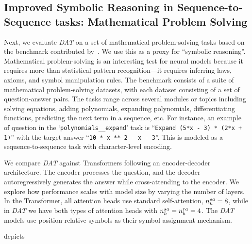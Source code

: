 
\subsection{Improved Symbolic Reasoning in Sequence-to-Sequence tasks: Mathematical Problem Solving}\label{ssec:math}

Next, we evaluate \textit{DAT} on a set of mathematical problem-solving tasks based on the benchmark contributed by~\citet{saxtonAnalyzingMathematicalReasoning2019}. We use this as a proxy for ``symbolic reasoning''. Mathematical problem-solving is an interesting test for neural models because it requires more than statistical pattern recognition---it requires inferring laws, axioms, and symbol manipulation rules. The benchmark consists of a suite of mathematical problem-solving datasets, with each dataset consisting of a set of question-answer pairs. The tasks range across several modules or topics including solving equations, adding polynomials, expanding polynomials, differentiating functions, predicting the next term in a sequence, etc. For instance, an example of question in the `\texttt{polynomials\_\_expand}' task is ``\texttt{Expand (5*x - 3) * (2*x + 1)}'' with the target answer ``\texttt{10 * x ** 2 - x - 3}''. This is modeled as a sequence-to-sequence task with character-level encoding.


We compare \textit{DAT} against Transformers following an encoder-decoder architecture. The encoder processes the question, and the decoder autoregressively generates the answer while cross-attending to the encoder. We explore how performance scales with model size by varying the number of layers. In the Transformer, all attention heads use standard self-attention, $n_h^{sa} = 8$, while in \textit{DAT} we have both types of attention heads with $n_h^{sa} = n_h^{ra} = 4$. The \textit{DAT} models use position-relative symbols as their symbol assignment mechanism.

 depicts 



